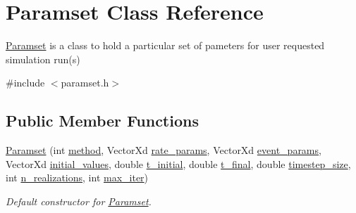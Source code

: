 \hypertarget{class_paramset}{}\section{Paramset Class Reference}
\label{class_paramset}


\hyperlink{class_paramset}{Paramset} is a class to hold a particular set of pameters for user requested simulation run(s)  




{\ttfamily \#include $<$paramset.\+h$>$}

\subsection*{Public Member Functions}
\begin{DoxyCompactItemize}
\item 
\hyperlink{class_paramset_a2893c9f0d0ad896fd1f55d4cda734cbd}{Paramset} (int \hyperlink{class_paramset_a67376577973f825ba60fc7c319ccc906}{method}, Vector\+Xd \hyperlink{class_paramset_a0bde34e534a67451a5e9317c9a1c8a81}{rate\+\_\+params}, Vector\+Xd \hyperlink{class_paramset_a25079a96917e88458073dedd724f2b68}{event\+\_\+params}, Vector\+Xd \hyperlink{class_paramset_ad7db1c48bae63ad5b392a7b4de9f5d56}{initial\+\_\+values}, double \hyperlink{class_paramset_a7d82a76c08567e5072aa1b125708c7d8}{t\+\_\+initial}, double \hyperlink{class_paramset_ac88cde461d8dbbd8a7d2636fc45f7119}{t\+\_\+final}, double \hyperlink{class_paramset_a0554913cf803a67bc59ffdee154abc24}{timestep\+\_\+size}, int \hyperlink{class_paramset_a50c0325e75983b66d0825406ec7873ac}{n\+\_\+realizations}, int \hyperlink{class_paramset_afeb86c327cd6966707996019609e6ed1}{max\+\_\+iter})
\begin{DoxyCompactList}\small\item\em Default constructor for \hyperlink{class_paramset}{Paramset}. \end{DoxyCompactList}\end{DoxyCompactItemize}
